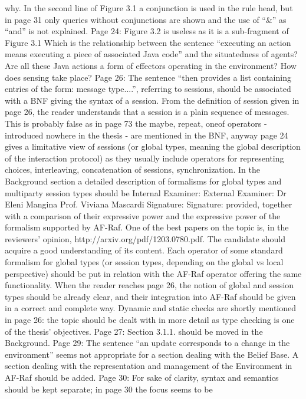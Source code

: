\documentclass{article}
\newenvironment{them}{\noindent\begingroup\color{blue}}{\endgroup\par}
\begin{document}
\begin{them}
why.
In the second line of Figure 3.1 a conjunction is used in the rule head, but in page 31 only queries
without conjunctions are shown and the use of “&” as “and” is not explained.
Page 24:
Figure 3.2 is useless as it is a sub-fragment of Figure 3.1
Which is the relationship between the sentence “executing an action means executing a piece of
associated Java code” and the situatedness of agents? Are all these Java actions a form of effectors
operating in the environment? How does sensing take place?
Page 26:
The sentence “then provides a list containing entries of the form: message type....”, referring to
sessions, should be associated with a BNF giving the syntax of a session. From the definition of
session given in page 26, the reader understands that a session is a plain sequence of messages. This
is probably false as in page 73 the maybe, repeat, oneof operators - introduced nowhere in the thesis
- are mentioned in the BNF, anyway page 24 gives a limitative view of sessions (or global types,
meaning the global description of the interaction protocol) as they usually include operators for
representing choices, interleaving, concatenation of sessions, synchronization. In the Background
section a detailed description of formalisms for global types and multiparty session types should be
Internal Examiner: External Examiner:
Dr Eleni Mangina Prof. Viviana Mascardi
Signature: Signature:
provided, together with a comparison of their expressive power and the expressive power of the
formalism supported by AF-Raf. One of the best papers on the topic is, in the reviewers' opinion,
http://arxiv.org/pdf/1203.0780.pdf. The candidate should acquire a good understanding of its
content. Each operator of some standard formalism for global types (or session types, depending on
the global vs local perspective) should be put in relation with the AF-Raf operator offering the same
functionality. When the reader reaches page 26, the notion of global and session types should be
already clear, and their integration into AF-Raf should be given in a correct and complete way.
Dynamic and static checks are shortly mentioned in page 26: the topic should be dealt with in more
detail as type checking is one of the thesis' objectives.
Page 27:
Section 3.1.1. should be moved in the Background.
Page 29:
The sentence “an update corresponds to a change in the environment” seems not appropriate for a
section dealing with the Belief Base. A section dealing with the representation and management of
the Environment in AF-Raf should be added.
Page 30:
For sake of clarity, syntax and semantics should be kept separate; in page 30 the focus seems to be

\end{them}
\end{document}
